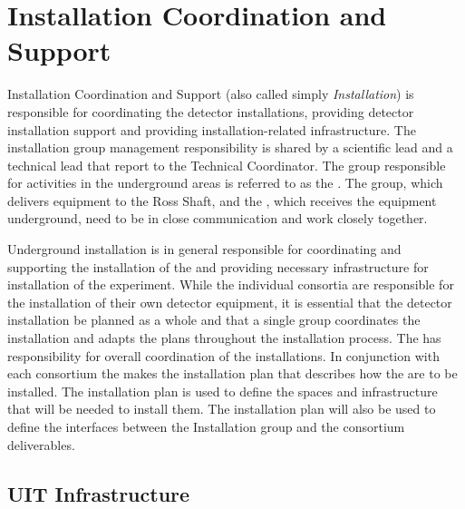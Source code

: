 \section{Installation Coordination and Support}
\label{sec:fdsp-coord-install}


Installation Coordination and Support %
(also called simply \textit{Installation}) is
responsible for coordinating the detector installations, providing
detector installation support and providing installation-related
infrastructure. The installation group management responsibility is
shared by a scientific lead and a technical lead that report to the
Technical Coordinator. The %
group responsible for activities in the underground areas is referred to as
the . The  group, which delivers equipment to the
Ross Shaft, and the , which receives the equipment
underground, need to be in close communication and work closely
together.

Underground installation is in general responsible for coordinating
and supporting the installation of the  and providing
necessary infrastructure for installation of the experiment. While the
individual consortia are responsible for the installation of their own
detector equipment, it is essential that the detector installation be
planned as a whole and that a single group coordinates the
installation and adapts the plans throughout the installation
process. The  has responsibility for overall coordination
of the installations. In conjunction with each consortium the
 makes the installation plan that describes how the
 are to be installed. The installation plan is used to define
the spaces and infrastructure that will be needed to install them.
The installation plan will also be used to define the
interfaces between the Installation group and the consortium
deliverables.

\subsection{UIT Infrastructure}

